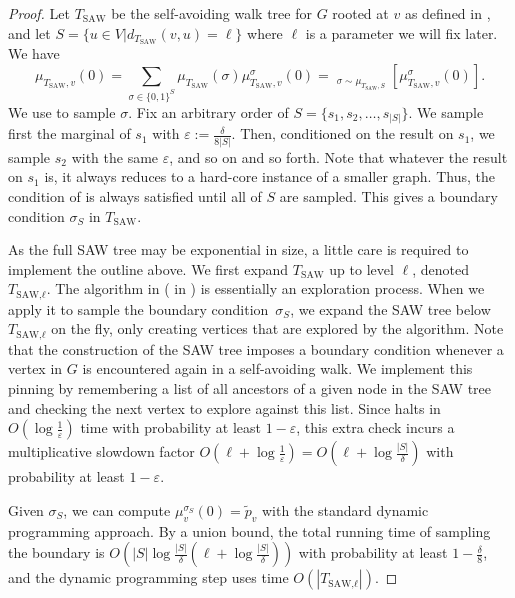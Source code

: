 \documentclass[11pt,a4paper]{amsart}
\newcommand{\Ex}{\mathop{\mathbb{{}E}}\nolimits}
\newcommand{\abs}[1]{\ensuremath{\left\vert#1\right\vert}}
\newcommand{\eps}{\varepsilon}
\newcommand{\defeq}{:=}
\theoremstyle{definition}
\theoremstyle{remark}
\newcommand{\TSAW}{T_{\mathrm{SAW}}}
\begin{document}
\begin{proof}
Let $\TSAW$ be the self-avoiding walk tree for $G$ rooted at $v$ as defined in , and let $S=\{u\in V|d_{\TSAW}(v,u)=\ell\}$ where $\ell$ is a parameter we will fix later. We have
\[\mu_{\TSAW,v}(0)=\sum_{\sigma\in\{0,1\}^S}\mu_{\TSAW}(\sigma)\mu_{\TSAW,v}^\sigma(0)=\Ex_{\sigma\sim\mu_{\TSAW,S}}[\mu_{\TSAW,v}^\sigma(0)].\]
We use  to sample $\sigma$.
Fix an arbitrary order of $S=\{s_1,s_2,\ldots,s_{\abs{S}}\}$.
We sample first the marginal of $s_1$ with $\eps\defeq\frac{\delta}{8\abs{S}}$.
Then, conditioned on the result on $s_1$, we sample $s_2$ with the same $\eps$, and so on and so forth.
Note that whatever the result on $s_1$ is, it always reduces to a hard-core instance of a smaller graph.
Thus, the condition of  is always satisfied until all of $S$ are sampled.
This gives a boundary condition $\sigma_S$ in $\TSAW$.

As the full SAW tree may be exponential in size,
a little care is required to implement the outline above.
We first expand $\TSAW$ up to level $\ell$, denoted $T_\textrm{SAW,$\ell$}$. %
The algorithm in  ( in ) is essentially an exploration process.
When we apply it to sample the boundary condition~$\sigma_S$,
we expand the SAW tree below $T_\textrm{SAW,$\ell$}$ on the fly,
only creating vertices that are explored by the algorithm.
Note that the construction of the SAW tree imposes a boundary condition whenever a vertex in $G$ is encountered again in a self-avoiding walk.
We implement this pinning by remembering a list of all ancestors of a given node in the SAW tree and checking the next vertex to explore against this list.
Since  halts in $O(\log\frac{1}{\eps})$ time with probability at least $1-\eps$,
this extra check incurs a multiplicative slowdown factor $O(\ell+\log\frac{1}{\eps})=O(\ell+\log\frac{\abs{S}}{\delta})$ with probability at least $1-\eps$. 

Given $\sigma_S$, we can compute $\mu_v^{\sigma_S}(0)=\widetilde{p}_v$ with the standard dynamic programming approach.
By a union bound, the total running time of sampling the boundary is $O(\abs{S}\log\frac{\abs{S}}{\delta}(\ell+\log\frac{\abs{S}}{\delta}))$ with probability at least $1-\frac{\delta}{8}$,
  and the dynamic programming step uses time $O(\abs{T_\textrm{SAW,$\ell$}})$.


\end{proof}
\end{document}
